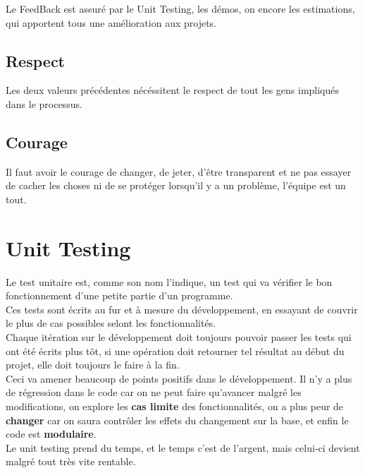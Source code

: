 \documentclass{report}
\begin{document}
			Le FeedBack est assuré par le Unit Testing, les démos, on encore les estimations, qui apportent tous une amélioration aux projets.\\


		\subsection{Respect}

			Les deux valeurs précédentes nécéssitent le respect de tout les gens impliqués dans le processus.\\

		\subsection{Courage}

			Il faut avoir le courage de changer, de jeter, d'être transparent et ne pas essayer de cacher les choses ni de se protéger lorsqu'il y a un problème, l'équipe est un tout.\\

	\section{Unit Testing}

		Le test unitaire est, comme son nom l'indique, un test qui va vérifier le bon fonctionnement d'une petite partie d'un programme.\\

		Ces tests sont écrits au fur et à mesure du développement, en essayant de couvrir le plus de cas possibles selont les fonctionnalités.\\
		Chaque itération sur le développement doit toujours pouvoir passer les tests qui ont été écrits plus tôt, si une opération doit retourner tel résultat au début du projet, elle doit toujours le faire à la fin.\\

		Ceci va amener beaucoup de points positifs dans le développement. Il n'y a plus de régression dans le code car on ne peut faire qu'avancer malgré les modifications, on explore les \textbf{cas limite} des fonctionnalités, on a plus peur de \textbf{changer} car on saura contrôler les effets du changement sur la base, et enfin le code est \textbf{modulaire}.\\

		Le unit testing prend du temps, et le temps c'est de l'argent, mais celui-ci devient malgré tout très vite rentable.\\
\end{document}
